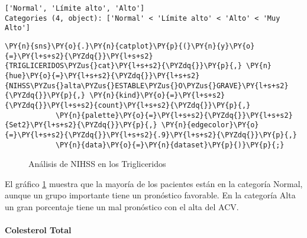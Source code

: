             \begin{tcolorbox}[breakable, size=fbox, boxrule=.5pt, pad at break*=1mm, opacityfill=0]
\begin{Verbatim}[commandchars=\\\{\}]
['Normal', 'Límite alto', 'Alto']
Categories (4, object): ['Normal' < 'Límite alto' < 'Alto' < 'Muy Alto']
\end{Verbatim}
\end{tcolorbox}
        
    \begin{tcolorbox}[breakable, size=fbox, boxrule=1pt, pad at break*=1mm,colback=cellbackground, colframe=cellborder]
\begin{Verbatim}[commandchars=\\\{\}]
\PY{n}{sns}\PY{o}{.}\PY{n}{catplot}\PY{p}{(}\PY{n}{y}\PY{o}{=}\PY{l+s+s2}{\PYZdq{}}\PY{l+s+s2}{TRIGLICERIDOS\PYZus{}cat}\PY{l+s+s2}{\PYZdq{}}\PY{p}{,} \PY{n}{hue}\PY{o}{=}\PY{l+s+s2}{\PYZdq{}}\PY{l+s+s2}{NIHSS\PYZus{}alta\PYZus{}ESTABLE\PYZus{}O\PYZus{}GRAVE}\PY{l+s+s2}{\PYZdq{}}\PY{p}{,} \PY{n}{kind}\PY{o}{=}\PY{l+s+s2}{\PYZdq{}}\PY{l+s+s2}{count}\PY{l+s+s2}{\PYZdq{}}\PY{p}{,}
            \PY{n}{palette}\PY{o}{=}\PY{l+s+s2}{\PYZdq{}}\PY{l+s+s2}{Set2}\PY{l+s+s2}{\PYZdq{}}\PY{p}{,} \PY{n}{edgecolor}\PY{o}{=}\PY{l+s+s2}{\PYZdq{}}\PY{l+s+s2}{.9}\PY{l+s+s2}{\PYZdq{}}\PY{p}{,}
            \PY{n}{data}\PY{o}{=}\PY{n}{dataset}\PY{p}{)}\PY{p}{;}
\end{Verbatim}
\end{tcolorbox}

\begin{center}
    	\begin{figure}[H]
	\centering
	\caption{Análisis de NIHSS en los Trigliceridos}
	\label{fig:aNISSh}
	\end{figure}
\end{center}
    
    El gráfico \ref{fig:aNISSh} muestra que la mayoría de los pacientes están en la categoría
Normal, aunque un grupo importante tiene un pronóstico favorable. En la
categoría Alta un gran porcentaje tiene un mal pronóstico con el alta
del ACV.

    \hypertarget{colesterol-total}{%
\paragraph{Colesterol Total}\label{colesterol-total}}

